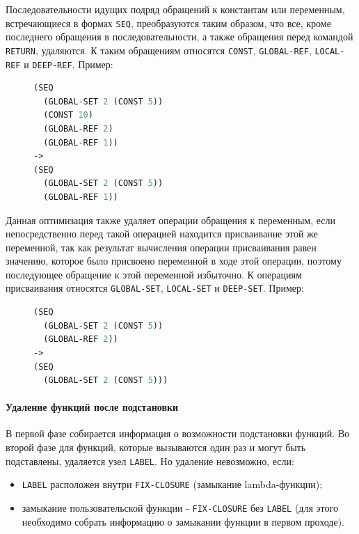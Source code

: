 Последовательности идущих подряд обращений к константам или переменным, встречающиеся в формах \texttt{SEQ}, преобразуются таким образом, что все, кроме последнего обращения в последовательности, а также обращения перед командой \texttt{RETURN}, удаляются. К таким обращениям относятся \texttt{CONST}, \texttt{GLOBAL-REF}, \texttt{LOCAL-REF} и \texttt{DEEP-REF}. Пример:

\begin{figure}[H]
\begin{lstlisting}[language=Lisp]
(SEQ
  (GLOBAL-SET 2 (CONST 5))
  (CONST 10)
  (GLOBAL-REF 2)
  (GLOBAL-REF 1))
->
(SEQ
  (GLOBAL-SET 2 (CONST 5))
  (GLOBAL-REF 1))
\end{lstlisting}
\end{figure}

Данная оптимизация также удаляет операции обращения к переменным, если непосредственно перед такой операцией находится присваивание этой же переменной, так как результат вычисления операции присваивания равен значению, которое было присвоено переменной в ходе этой операции, поэтому последующее обращение к этой переменной избыточно. К операциям присваивания относятся \texttt{GLOBAL-SET}, \texttt{LOCAL-SET} и \texttt{DEEP-SET}. Пример:

\begin{figure}[H]
\begin{lstlisting}[language=Lisp]
(SEQ
  (GLOBAL-SET 2 (CONST 5))
  (GLOBAL-REF 2))
->
(SEQ
  (GLOBAL-SET 2 (CONST 5)))
\end{lstlisting}
\end{figure}


\paragraph{Удаление функций после подстановки}

В первой фазе собирается информация о возможности подстановки функций. Во второй фазе для функций, которые вызываются один раз и могут быть подставлены, удаляется узел \texttt{LABEL}. Но удаление невозможно, если:

\begin{itemize}
\item \texttt{LABEL} расположен внутри \texttt{FIX-CLOSURE} (замыкание lambda-функции);
\item замыкание пользовательской функции - \texttt{FIX-CLOSURE} без \texttt{LABEL} (для этого необходимо собрать информацию о замыкании функции в первом проходе).
\end{itemize}


